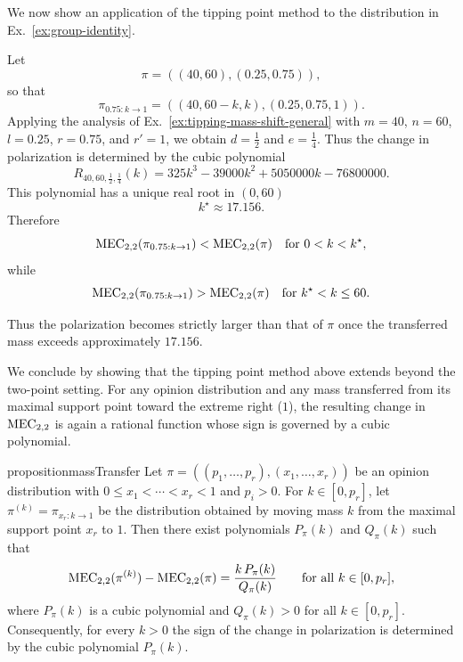 We now show an application of the tipping point method to the distribution in 
Ex.~\ref{ex:group-identity}.

\begin{example}
Let
\[
\pi=((40,60),(0.25,0.75)),
\]
so that
\[
\pi_{0.75:k\rightarrow1}=((40,60-k,k),(0.25,0.75,1)).
\]
Applying the analysis of Ex.~\ref{ex:tipping-mass-shift-general} with
\(m=40\), \(n=60\), \(l=0.25\), \(r=0.75\), and \(r'=1\), we obtain
\(d=\frac12\) and \(e=\frac14\). Thus the change in polarization is
determined by the cubic polynomial
\[
R_{40,60,\frac12,\frac14}(k)
=
325k^3-39000k^2+5050000k-76800000.
\]
This polynomial has a unique real root in \((0,60)\) 
\[
k^\star\approx 17.156.
\]
Therefore
\[
\MEC[2,2](\pi_{0.75:k\rightarrow1})<\MEC[2,2](\pi)
\quad\text{for }0<k<k^\star,
\]
while
\[
\MEC[2,2](\pi_{0.75:k\rightarrow1})>\MEC[2,2](\pi)
\quad\text{for }k^\star<k\le 60.
\]

Thus the polarization becomes strictly larger than that of \(\pi\) once the
transferred mass exceeds approximately \(17.156\).
\end{example}

We conclude by showing that the tipping point method above extends beyond the two-point setting. For any opinion distribution and any mass transferred from its maximal support point toward the extreme right (\(1\)), the resulting change in \(\MEC[2,2]\) is again a rational function whose sign is governed by a cubic polynomial.

\begin{restatable}{proposition}{massTransfer}
\label{prop:mec22-mass-transfer}
Let
\(
\pi=((p_1,\dots,p_r),(x_1,\dots,x_r))
\)
be an opinion distribution with
\(
0\le x_1<\cdots<x_r<1
\)
and \(p_i>0\). For \(k\in[0,p_r]\), let \(\pi^{(k)}=\pi_{x_r:k\to 1}\) be the distribution obtained by moving mass \(k\) from the maximal support point \(x_r\) to \(1\). Then there exist polynomials \(P_\pi(k)\) and \(Q_\pi(k)\) such that
\[
\MEC[2,2](\pi^{(k)})-\MEC[2,2](\pi)
=
\frac{k\,P_\pi(k)}{Q_\pi(k)}
\qquad\text{for all }k\in[0,p_r],
\]
where \(P_\pi(k)\) is a cubic polynomial and \(Q_\pi(k)>0\) for all \(k\in[0,p_r]\). Consequently, for every \(k>0\) the sign of the change in polarization is determined by the cubic polynomial \(P_\pi(k)\).
\end{restatable}
